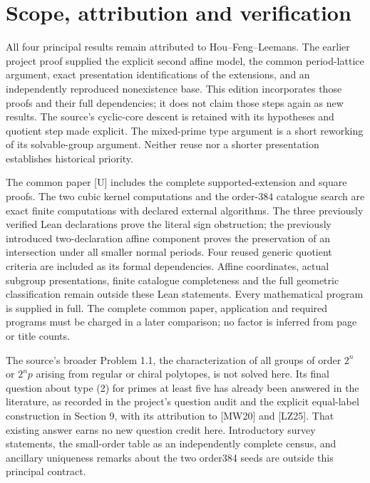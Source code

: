\section{Scope, attribution and verification}
All four principal results remain attributed to Hou--Feng--Leemans. The earlier project proof supplied the explicit second affine model, the common period-lattice argument, exact presentation identifications of the extensions, and an independently reproduced nonexistence base. This edition incorporates those proofs and their full dependencies; it does not claim those steps again as new results. The source's cyclic-core descent is retained with its hypotheses and quotient step made explicit. The mixed-prime type argument is a short reworking of its solvable-group argument. Neither reuse nor a shorter presentation establishes historical priority.

The common paper [U] includes the complete supported-extension and square proofs. The two cubic kernel computations and the order-384 catalogue search are exact finite computations with declared external algorithms. The three previously verified Lean declarations prove the literal sign obstruction; the previously introduced two-declaration affine component proves the preservation of an intersection under all smaller normal periods. Four reused generic quotient criteria are included as its formal dependencies. Affine coordinates, actual subgroup presentations, finite catalogue completeness and the full geometric classification remain outside these Lean statements. Every mathematical program is supplied in full. The complete common paper, application and required programs must be charged in a later comparison; no factor is inferred from page or title counts.

The source's broader Problem 1.1, the characterization of all groups of
order \(2^n\) or \(2^n p\) arising from regular or chiral polytopes, is not
solved here. Its final question about type (2) for primes at least five
has already been answered in the literature, as recorded in the
project's question audit and the explicit equal-label construction in Section 9, with its attribution to [MW20] and [LZ25]. That existing answer earns no new question credit here. Introductory
survey statements, the small-order table as an independently complete
census, and ancillary uniqueness remarks about the two order384 seeds
are outside this principal contract.
